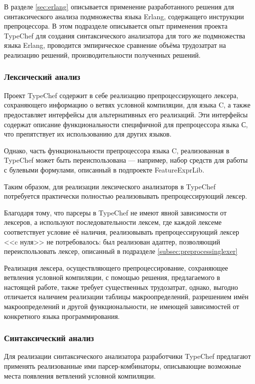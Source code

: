В разделе \ref{sec:erlang} описывается применение разработанного решения для синтаксического анализа подмножества языка Erlang, содержащего инструкции препроцессора. В этом подразделе описывается опыт применения проекта TypeChef для создания синтаксического анализатора для того же подмножества языка Erlang, проводится эмпирическое сравнение объёма трудозатрат на реализацию решений, производительности полученных решений.

\subsubsection{Лексический анализ}

Проект TypeChef содержит в себе реализацию препроцессирующего лексера, сохраняющего информацию о ветвях условной компиляции, для языка C, а также предоставляет интерфейсы для альтернативных его реализаций. Эти интерфейсы содержат описание функциональности специфичной для препроцессора языка С, что препятствует их использованию для других языков.

Однако, часть функциональности препроцессора языка C, реализованная в TypeChef может быть переиспользована --- например, набор средств для работы с булевыми формулами, описанный в подпроекте FeatureExprLib.

Таким образом, для реализации лексического анализаторв в TypeChef потребуется практически полностью реализовывать препроцессирующий лексер. 

Благодаря тому, что парсеры в TypeChef не имеют явной зависимости от лексеров, а используют последовательности лексем, где каждой лексеме соответствует условие её наличия, реализовывать препроцессирующий лексер <<c нуля>> не потребовалось: был реализован адаптер, позволяющий переиспользовать лексер, описанный в подразделе \ref{subsec:preprocessinglexer}

Реализация лексера, осуществляющего препроцессирование, сохраняющее ветвления условной компиляции, с помощью решения, предлагаемого в настоящей работе, также требует существенных трудозатрат, однако, выгодно отличается наличием реализации таблицы макроопределений, разрешением имён макроопределений и другой функциональности, не имеющей зависимостей от конкретного языка программирования.

\subsubsection{Синтаксический анализ}

Для реализации синтаксического анализатора разработчики TypeChef предлагают применять реализованные ими парсер-комбинаторы, описывающие возможные места появления ветвлений условной компиляции. 

